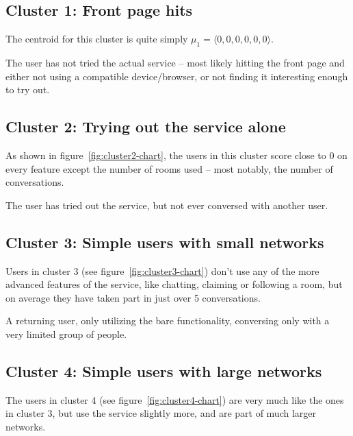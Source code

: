 \subsection{Cluster 1: Front page hits}
\label{cluster:front_page_hits}

The centroid for this cluster is quite simply $\mu_1 = \langle 0, 0, 0, 0, 0, 0 \rangle$.

\begin{persona}
  The user has not tried the actual service -- most likely hitting the front page and either not using a compatible device/browser, or not finding it interesting enough to try out.
\end{persona}

\subsection{Cluster 2: Trying out the service alone}

As shown in figure~\ref{fig:cluster2-chart}, the users in this cluster score close to 0 on every feature except the number of rooms used -- most notably, the number of conversations.

\begin{persona}
  The user has tried out the service, but not ever conversed with another user.
\end{persona}

\subsection{Cluster 3: Simple users with small networks}

Users in cluster 3 (see figure~\ref{fig:cluster3-chart}) don't use any of the more advanced features of the service, like chatting, claiming or following a room, but on average they have taken part in just over 5 conversations.

\begin{persona}
  A returning user, only utilizing the bare functionality, conversing only with a very limited group of people.
\end{persona}

\subsection{Cluster 4: Simple users with large networks}

The users in cluster 4 (see figure~\ref{fig:cluster4-chart}) are very much like the ones in cluster 3, but use the service slightly more, and are part of much larger networks.

